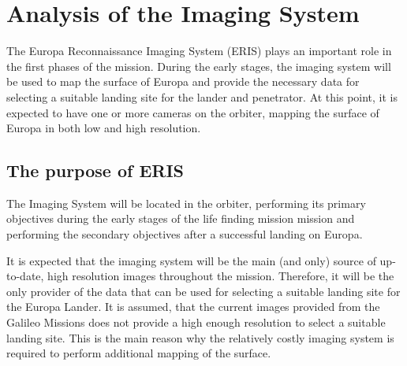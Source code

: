 \section{Analysis of the Imaging System}
The Europa Reconnaissance Imaging System (ERIS) plays an important role in the first phases of the mission. During the early stages, the imaging system will be used to map the surface of Europa and provide the necessary data for selecting a suitable landing site for the lander and penetrator. At this point, it is expected to have one or more cameras on the orbiter, mapping the surface of Europa in both low and high resolution. 
\subsection{The purpose of ERIS}
The Imaging System will be located in the orbiter, performing its primary objectives during the early stages of the life finding mission mission and performing the secondary objectives after a successful landing on Europa.

It is expected that the imaging system will be the main (and only) source of up-to-date, high resolution images throughout the mission. Therefore, it will be the only provider of the data that can be used for selecting a suitable landing site for the Europa Lander. It is assumed, that the current images provided from the Galileo Missions does not provide a high enough resolution to select a suitable landing site. This is the main reason why the relatively costly imaging system is required to perform additional mapping of the surface. 
